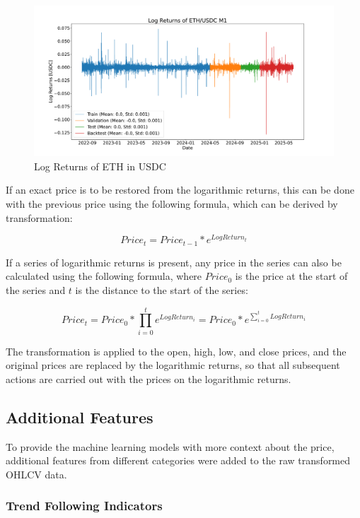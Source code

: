 \begin{figure}[H]
    \centering
    \includegraphics[width=\textwidth]{images/eda/log_returns_ethusdc}
    \caption{Log Returns of ETH in USDC}
    \label{fig:eth-log-data}
\end{figure}

\noindent
If an exact price is to be restored from the logarithmic returns, this can be done with the previous price using the following formula, which can be derived by transformation:

\[
    Price_t = Price_{t-1} * e^{LogReturn_t}
\]

\noindent
If a series of logarithmic returns is present, any price in the series can also be calculated using the following formula, where $Price_{0}$ is the price at the start of the series and $t$ is the distance to the start of the series:

\[
    Price_t = Price_0 * \prod_{i=0}^{t} e^{LogReturn_{i}} = Price_0 * e^{\sum_{i=0}^{t} LogReturn_i}
\]

\noindent
The transformation is applied to the open, high, low, and close prices, and the original prices are replaced by the logarithmic returns, so that all subsequent actions are carried out with the prices on the logarithmic returns.

\subsection{Additional Features}
\label{chap:additional-features}

To provide the machine learning models with more context about the price, additional features from different categories were added to the raw transformed OHLCV data.

\subsubsection{Trend Following Indicators}

